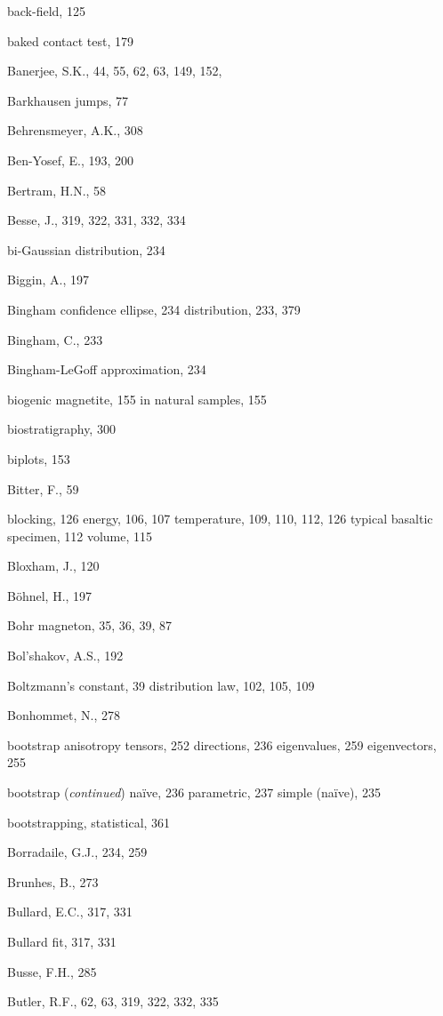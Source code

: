 \documentclass[,plain]{tauxe}
\begin{document}
\begin{theindex}
  \item back-field, 125  
\item baked contact test, 179
  \item Banerjee, S.K., 44, 55, 62, 63, 149, 152,
  \item Barkhausen jumps, 77
  \item Behrensmeyer, A.K., 308
  \item Ben-Yosef, E., 193, 200
  \item Bertram, H.N., 58
  \item Besse, J., 319, 322, 331, 332, 334
  \item bi-Gaussian distribution, 234
  \item Biggin, A., 197
  \item Bingham
    \subitem confidence ellipse, 234
	\subitem distribution, 233, 379
  \item Bingham, C., 233
  \item Bingham-LeGoff approximation, 234
  \item biogenic magnetite, 155
    \subitem in natural samples, 155
  \item biostratigraphy, 300
  \item biplots, 153
  \item Bitter, F., 59
  \item blocking, 126
    \subitem energy, 106, 107
    \subitem temperature, 109, 110, 112, 126
    \subitem typical basaltic specimen, 112
\subitem volume, 115
    
  \item Bloxham, J., 120
 \item B\"ohnel, H., 197
\item Bohr magneton, 35, 36, 39, 87
    \item Bol'shakov, A.S., 192
  \item Boltzmann's
    \subitem constant, 39
    \subitem distribution law, 102, 105, 109
  \item Bonhommet, N., 278
  \item bootstrap
    \subitem anisotropy tensors, 252
    \subitem directions, 236
    \subitem eigenvalues, 259
    \subitem eigenvectors, 255
\item bootstrap ({\it continued})
    \subitem na\"ive, 236
    \subitem parametric, 237
 \subitem simple (na\"ive), 235
 \item bootstrapping, statistical, 361
  \item Borradaile, G.J., 234, 259
  \item Brunhes, B., 273
  \item Bullard, E.C., 317, 331
  \item Bullard fit, 317, 331
  \item Busse, F.H., 285
  \item Butler, R.F., 62, 63, 319, 322, 332, 335


\end{theindex}
\end{document}
